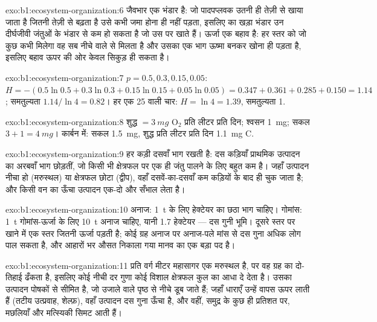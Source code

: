 \begin{solution}{exo:b1:ecosystem-organization:6}
जैवभार एक भंडार है: जो पादपप्लवक उतनी ही तेज़ी से खाया जाता है जितनी
तेज़ी से बढ़ता है उसे कभी जमा होना ही नहीं पड़ता, इसलिए  का खड़ा
भंडार उन दीर्घजीवी जंतुओं के भंडार से कम हो सकता है जो उस पर खाते हैं।
ऊर्जा एक बहाव है: हर स्तर को जो कुछ कभी मिलेगा वह सब नीचे वाले से मिलता है
और उसका एक भाग ऊष्मा बनकर खोना ही पड़ता है, इसलिए बहाव ऊपर की ओर केवल
सिकुड़ ही सकता है।
\end{solution}

\begin{solution}{exo:b1:ecosystem-organization:7}
$p = 0.5, 0.3, 0.15, 0.05$: $H = -(0.5\ln 0.5 + 0.3\ln 0.3 + 0.15\ln
0.15 + 0.05\ln 0.05) = 0.347 + 0.361 + 0.285 + 0.150 = 1.14$;
समतुल्यता $1.14/\ln 4 = 0.82$। हर एक 25 वाली चार: $H = \ln 4 = 1.39$,
समतुल्यता 1.
\end{solution}

\begin{solution}{exo:b1:ecosystem-organization:8}
शुद्ध $= \qty{3}{mg}$ $\mathrm{O_2}$ प्रति लीटर प्रति दिन; श्वसन
\qty{1}{mg}; सकल $3 + 1 = \qty{4}{mg}$। कार्बन में: सकल
\qty{1.5}{mg}, शुद्ध प्रति लीटर प्रति दिन \qty{1.1}{mg} C.
\end{solution}

\begin{solution}{exo:b1:ecosystem-organization:9}
हर कड़ी दसवाँ भाग रखती है: दस कड़ियाँ प्राथमिक उत्पादन का
अरबवाँ भाग छोड़तीं, जो किसी भी क्षेत्रफल पर एक ही जंतु पालने के लिए बहुत
कम है। जहाँ उत्पादन नीचा हो (मरुस्थल) या क्षेत्रफल छोटा (द्वीप), वहाँ
दसवें-का-दसवाँ कम कड़ियों के बाद ही चुक जाता है; और किसी वन का ऊँचा
उत्पादन एक-दो और सँभाल लेता है।
\end{solution}

\begin{solution}{exo:b1:ecosystem-organization:10}
अनाज: \qty{1}{t} के लिए हेक्टेयर का छठा भाग चाहिए। गोमांस: \qty{1}{t}
गोमांस-ऊर्जा के लिए \qty{10}{t} अनाज चाहिए, यानी \num{1.7} हेक्टेयर ---
दस गुनी भूमि। दूसरे स्तर पर खाने में एक स्तर जितनी ऊर्जा पड़ती है;
कोई ग्रह अनाज पर अनाज-पले मांस से दस गुना अधिक लोग पाल सकता है,
और आहारों भर औसत निकाला गया मानव   का एक बड़ा पद है।
\end{solution}

\begin{solution}{exo:b1:ecosystem-organization:11}
प्रति वर्ग मीटर महासागर एक मरुस्थल है, पर वह ग्रह का दो-तिहाई ढँकता
है, इसलिए कोई नीची दर गुणा कोई विशाल क्षेत्रफल कुल का आधा दे देता है। उसका
उत्पादन पोषकों से सीमित है, जो उजाले वाले पृष्ठ से नीचे डूब जाते हैं;
जहाँ धाराएँ उन्हें वापस ऊपर लाती हैं (तटीय उत्प्रवाह, शेल्फ़), वहाँ
उत्पादन दस गुना ऊँचा है, और वहीं, समुद्र के कुछ ही प्रतिशत पर, मछलियाँ
और मत्स्यिकी सिमट आती हैं।
\end{solution}

